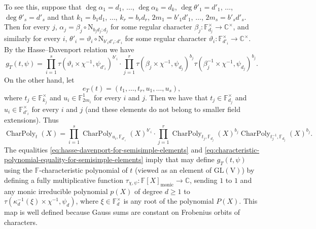\documentclass[12pt, reqno]{amsart}
\theoremstyle{definition}
\theoremstyle{definition}
\theoremstyle{definition}
\newcommand{\cComplex}{\mathbb{C}}
\newcommand{\multiplicativegroup}[1]{#1^{\times}}
\newcommand{\hermitianSpace}{\mathrm{V}}
\newcommand{\fieldCharacter}{\psi}
\newcommand{\GL}{\mathrm{GL}}
\newcommand{\FieldNorm}[2]{\mathrm{N}_{#1:#2}}
\newcommand{\finiteField}{\mathbb{F}}
\newcommand{\finiteFieldExtension}[1]{\finiteField_{#1}}
\newcommand{\GaussSumCharacter}[3]{\tau\left(#1 \times #2, #3\right)}
\newcommand{\ToriDualToriIsomorphism}{\kappa}
\newcommand{\characteristicPolynomial}{\operatorname{CharPoly}}
\begin{document}
To see this, suppose that $\deg \alpha_1 = d_1$, $\dots$, $\deg \alpha_k = d_k$, $\deg \theta'_1 = d'_1$, $\dots$, $\deg \theta'_s = d'_s$ and that $k_1 = b_1 d_1$, $\dots$, $k_r = b_r d_r$, $2m_1 = b'_1 d'_1$, $\dots$, $2m_s = b'_s d'_s$. Then for every $j$,
$\alpha_j = \beta_j \circ \FieldNorm{b_j d_j}{d_j}$ for some regular character $\beta_j \colon \multiplicativegroup{\finiteFieldExtension{d_j}} \to \multiplicativegroup{\cComplex}$, and similarly for every $i$, $\theta'_i = \vartheta_i \circ \FieldNorm{b'_i d'_i}{d'_i}$ for some regular character $\vartheta_i \colon \multiplicativegroup{\finiteFieldExtension{d'_i}} \to \multiplicativegroup{\cComplex}$. By the Hasse--Davenport relation we have \begin{equation}\label{eq:hasse-davenport-for-semisimple-elements}
	g_T\left(t, \fieldCharacter\right) = \prod_{i=1}^s \GaussSumCharacter{\vartheta_i}{\chi^{-1}}{\fieldCharacter_{d'_i}}^{b'_i} \cdot  \prod_{j=1}^r \GaussSumCharacter{\beta_j}{\chi^{-1}}{\fieldCharacter_{d_j}}^{b_j} \GaussSumCharacter{\beta_j^{-1}}{\chi^{-1}}{\fieldCharacter_{d_j}}^{b_j}.
\end{equation}
On the other hand, let $$e_T\left(t\right) = \left(t_1,\dots,t_r,u_1,\dots,u_s\right),$$
where $t_j \in \multiplicativegroup{\finiteFieldExtension{k_j}}$ and $u_i \in \finiteFieldExtension{2m_i}^1$ for every $i$ and $j$. Then we have that $t_j \in \multiplicativegroup{\finiteFieldExtension{d_j}}$ and $u_i \in \multiplicativegroup{\finiteFieldExtension{d'_i}}$ for every $i$ and $j$ (and these elements do not belong to smaller field extensions). Thus
\begin{equation}\label{eq:characteristic-polynomial-equality-for-semisimple-elements}
	\characteristicPolynomial_{t}\left(X\right) = \prod_{i=1}^s \characteristicPolynomial_{u_i, \finiteFieldExtension{d'_i}}\left(X\right)^{b'_i} \cdot \prod_{j=1}^r \characteristicPolynomial_{t_j, \finiteFieldExtension{d_j}}\left(X\right)^{b_j}\characteristicPolynomial_{t_j^{-1}, \finiteFieldExtension{d_j}}\left(X\right)^{b_j}.
\end{equation}
The equalities \eqref{eq:hasse-davenport-for-semisimple-elements} and \eqref{eq:characteristic-polynomial-equality-for-semisimple-elements} imply that may define $g_T\left(t,\fieldCharacter\right)$ using the $\finiteField$-characteristic polynomial of $t$ (viewed as an element of $\GL\left(\hermitianSpace\right)$) by defining a fully multiplicative function $\tau_{\chi, \fieldCharacter} \colon \finiteField\left[X\right]_{\mathrm{monic}} \to \cComplex$, sending $1$ to $1$ and any monic irreducible polynomial $p\left(X\right)$ of degree $d \ge 1$ to $\GaussSumCharacter{\ToriDualToriIsomorphism_{d}^{-1}\left(\xi\right)}{\chi^{-1}}{\fieldCharacter_d}$, where $\xi \in \multiplicativegroup{\finiteFieldExtension{d}}$ is any root of the polynomial $P\left(X\right)$. This map is well defined because Gauss sums are constant on Frobenius orbits of characters.
\end{document}
